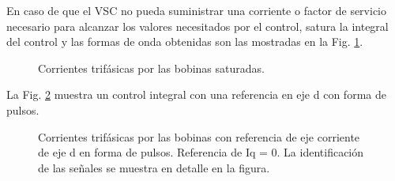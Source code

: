 \documentclass{report}
\begin{document}
En caso de que el VSC no pueda suministrar una corriente o factor de servicio necesario para alcanzar los valores necesitados por el control, satura la integral del control y las formas de onda obtenidas son las mostradas en la Fig. \ref{fig.20191213_132600_094}.
\begin{figure}[!h]
    \begin{center}
    \resizebox{10cm}{!}{\texttt{[image: 20191213\_132600\_094]}}
    \caption{Corrientes trifásicas por las bobinas saturadas.}
    \label{fig.20191213_132600_094} 
    \end{center}
\end{figure}

\clearpage
La Fig. \ref{fig.20191212_121543_752} muestra un control integral con una referencia en eje d con forma de pulsos.

\begin{figure}[!h]
    \begin{center}
    \resizebox{9cm}{!}{\texttt{[image: 20191212\_121543\_752]}}
    \caption{Corrientes trifásicas por las bobinas con referencia de eje corriente de eje d en forma de pulsos. Referencia de Iq = 0. La identificación de las señales se muestra en detalle en la figura.}
    \label{fig.20191212_121543_752} 
    \end{center}
\end{figure}

\begin{comment}
\begin{table}[!h]
    \begin{minipage}{\textwidth}
    \begin{center}
    \begin{tabular}{|c|c|c|c|c|c|} \hline\hline\hline
    Canal & Color & Elemento & Amplitud (V) & Nº Espiras & Amperaje (A) \\ \hline
    1 & Amarillo & $I_{a}$ & 1.60 & 1 & 1.6\\ \hline
    2 & Verde & $I_{b}$ & 2.81 & 1 & 2.81\\ \hline   
    3 & Rosa & $I_{c}$ & 1.28 & 1 & 1.28\\ \hline
    4 & Azul Claro & $I_{d}$ & 0.705 & - & 1.153 \footnotetext[1]{Aplicando  (\ref{eq.equivalenciacorrientedqreal}) de la página \pageref{eq.equivalenciacorrientedqreal}} \\ \hline
    5 \footnotetext[2]{Solo representa cuando se aplica el escalón, no el valor del escalón en sí.} & Rojo & $I_{d}^{ref}$ & - & - & 1.25 \\ \hline
    \end{tabular}
    \end{center}
    \caption{Tabla con los datos de la Fig. \ref{fig.20191212_121543_752}) con las corrientes trifásicas.} \label{tab.20191212_121543_752}
\end{minipage}
\end{table}
\end{comment}
\clearpage
\end{document}
